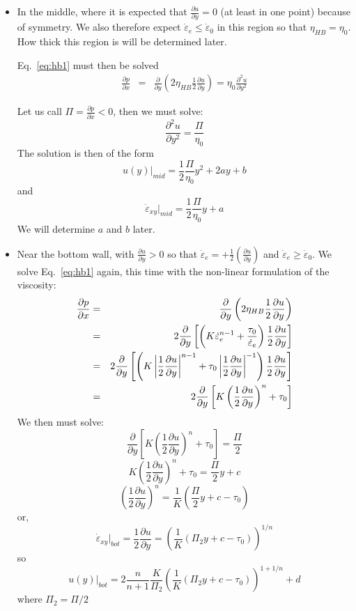 \begin{itemize}

\item In the middle, where it is expected that $\frac{\partial u}{\partial y}=0$ (at least in one point)
because of symmetry. We also therefore expect $\dot{\varepsilon}_e\leq \dot{\varepsilon}_0$ in this region
so that $\eta_{HB}=\eta_0$. How thick this region is will be determined later. 

Eq.~\eqref{eq:hb1} must then be solved 
\begin{eqnarray}
\frac{\partial p}{\partial x}  
&=&\frac{\partial }{\partial y} \left(2\eta_{HB}  \frac{1}{2}\frac{\partial u}{\partial y} \right) 
= \eta_0 \frac{\partial^2 u}{\partial y^2}  
\end{eqnarray}

Let us call $\Pi=\frac{\partial p}{\partial x} <0$, then we must solve:
\[
\frac{\partial^2 u}{\partial y^2} = \frac{\Pi}{\eta_0} 
\]
The solution is then of the form
\[
\boxed{
u(y)|_{mid} = \frac{1}{2}\frac{\Pi}{\eta_0} y^2 + 2a y + b
}
\]
and 
\[
\boxed{
\dot{\varepsilon}_{xy}|_{mid}= \frac{1}{2} \frac{\Pi}{\eta_0}y  + a
}
\]
We will determine $a$ and $b$ later. 

\item Near the bottom wall, with $\frac{\partial u}{\partial y}>0$ so that  
$\dot{\varepsilon}_{e} = +\frac{1}{2}\left( \frac{\partial u}{\partial y}  \right)$  
and $\dot{\varepsilon}_e\geq \dot{\varepsilon}_0 $. 
We solve Eq.~\eqref{eq:hb1} again, this time with the non-linear formulation of the viscosity: 
\begin{eqnarray}
\frac{\partial p}{\partial x}  
&=&\frac{\partial }{\partial y} \left( 2 \eta_{HB}  \frac{1}{2}\frac{\partial u}{\partial y} \right)  \nonumber\\
&=&2 \frac{\partial }{\partial y} \left[  
\left( K  \dot{\varepsilon}_e^{n-1} + \frac{\tau_0}{\dot{\varepsilon}_e}  
\right) \frac{1}{2}\frac{\partial u}{\partial y} \right] \nonumber\\
&=&2\frac{\partial }{\partial y} \left[  
\left( K \left|\frac{1}{2}\frac{\partial u}{\partial y}\right|^{n-1} 
+ \tau_0 \left|\frac{1}{2}\frac{\partial u}{\partial y}\right|^{-1} 
\right) \frac{1}{2}\frac{\partial u}{\partial y} \right]  \nonumber\\
&=& 2 \frac{\partial }{\partial y} \left[  
K \left(\frac{1}{2}\frac{\partial u}{\partial y}\right)^{n} + \tau_0 \right] 
\end{eqnarray}
We then must solve:
\[
\frac{\partial }{\partial y} \left[  
K \left(\frac{1}{2}\frac{\partial u}{\partial y}\right)^{n} + \tau_0 \right] 
= \frac{\Pi}{2}
\]
\[
K \left(\frac{1}{2}\frac{\partial u}{\partial y}\right)^{n} + \tau_0  = \frac{\Pi}{2} y +c
\]
\[
\left(\frac{1}{2}\frac{\partial u}{\partial y}\right)^{n}   = \frac{1}{K} ( \frac{\Pi}{2} y +c -\tau_0 )
\]
or, 
\[
\boxed{
\dot{\varepsilon}_{xy}|_{bot}=
\frac{1}{2}\frac{\partial u}{\partial y}  = \left( \frac{1}{K} ( \Pi_2 y +c -\tau_0 ) \right)^{1/n}
}
\]
so 
\[
\boxed{
u(y)|_{bot} = 2 \frac{n}{n+1} \frac{K}{\Pi_2} \left( \frac{1}{K} ( \Pi_2 y +c -\tau_0 ) \right)^{1+1/n} + d
}
\]
where $\Pi_2=\Pi/2$


\end{itemize}
